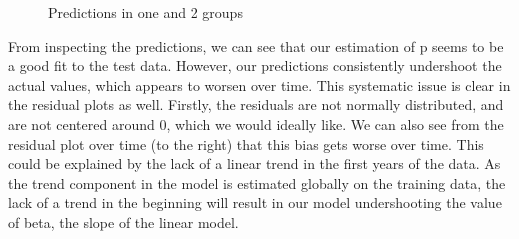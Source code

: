 \documentclass{article}
\begin{document}
\begin{figure}[H]
    \centering
    \quad
    \quad
    \caption{Predictions in one and 2 groups}
\end{figure}

From inspecting the predictions, we can see that our estimation of p seems to be a good fit to the test data. However, our predictions consistently undershoot the actual values, which appears to worsen over time. This systematic issue is clear in the residual plots as well. Firstly, the residuals are not normally distributed, and are not centered around 0, which we would ideally like. We can also see from the residual plot over time (to the right) that this bias gets worse over time. This could be explained by the lack of a linear trend in the first years of the data. As the trend component in the model is estimated globally on the training data, the lack of a trend in the beginning will result in our model undershooting the value of beta, the slope of the linear model. 
\end{document}

